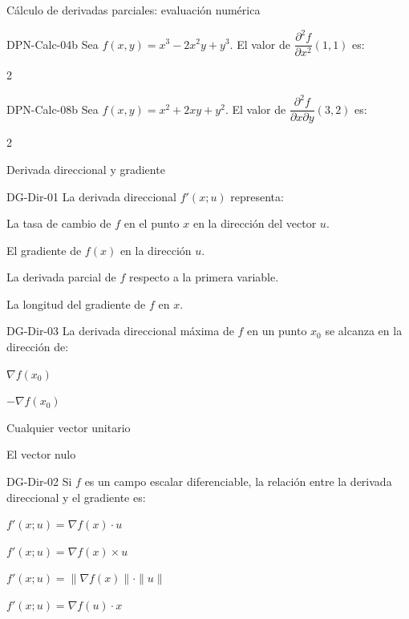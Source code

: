 \documentclass[a4,11pt]{aleph-notas}
\begin{document}
\begin{quiz}{Cálculo de derivadas parciales: evaluación numérica}
\begin{numerical}[tolerance=0.01]%
    {DPN-Calc-04b}
    Sea $f(x,y) = x^3 - 2x^2 y + y^3$. El valor de $\dfrac{\partial^2 f}{\partial x^2}(1,1)$ es:
    \item 2
\end{numerical}

\begin{numerical}[tolerance=0.01]%
    {DPN-Calc-08b}
    Sea $f(x,y) = x^2 + 2xy + y^2$. El valor de $\dfrac{\partial^2 f}{\partial x \partial y}(3,2)$ es:
    \item 2
\end{numerical}

\end{quiz}


\begin{quiz}{Derivada direccional y gradiente}

\begin{multi}[]%
    {DG-Dir-01}
    La derivada direccional $f'({x};{u})$ representa:
    \item* La tasa de cambio de $f$ en el punto ${x}$ en la dirección del vector  ${u}$.
    \item El gradiente de $f(x)$ en la dirección ${u}$.
    \item La derivada parcial de $f$ respecto a la primera variable.
    \item La longitud del gradiente de $f$ en ${x}$.
\end{multi}

\begin{multi}[]%
    {DG-Dir-03}
    La derivada direccional máxima de $f$ en un punto ${x}_0$ se alcanza en la dirección de:
    \item* $\nabla f({x}_0)$
    \item $-\nabla f({x}_0)$
    \item Cualquier vector unitario
    \item El vector nulo
\end{multi}

\begin{multi}[]%
    {DG-Dir-02}
    Si $f$ es un campo escalar diferenciable, la relación entre la derivada direccional y el gradiente es:
    \item* $f'({x};{u}) = \nabla f({x}) \cdot {u}$
    \item $f'({x};{u}) = \nabla f({x}) \times {u}$
    \item $f'({x};{u}) = \|\nabla f({x})\| \cdot \|{u}\|$
    \item $f'({x};{u}) = \nabla f({u}) \cdot {x}$
\end{multi}


\end{quiz}
\end{document}
